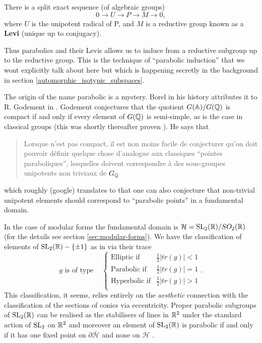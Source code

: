 \begin{Lemma}
    There is a split exact sequence (of algebraic groups)
    \[0 \to U \to P \to M \to 0,\]
    where \(U\) is the unipotent radical of P, and \(M\) is a reductive group known as a \textbf{Levi} (unique up to conjugacy).
\end{Lemma}

Thus parabolics and their Levis allows us to induce from a reductive subgroup up to the reductive group. This is the technique of ``parabolic induction'' \cite[Thm. 10]{bernsteinREPRESENTATIONSPADICGROUPS1992} that we wont explicitly talk about here but which is happening secretly in the background in section \ref{automorphic_isotypic_subspaces}.

\begin{Remark}
    The origin of the name parabolic is a mystery. Borel in his history \cite[VI.\S 2]{EssaysHistoryLie} attributes it to R. Godement in \cite{godementGroupesLineairesAlgebriques}. Godement conjectures that the quotient \(G(\A) / G(\Q)\) is compact if and only if every element of \(G(\Q)\) is semi-simple, as is the case in classical groups (this was shortly thereafter proven \cite{mostowCompactnessArithmeticallyDefined1962}). He says that 
    \begin{quote}
        Lorsque n'est pas compact, il est non moins facile de conjecturer qu’on doit pouvoir définir quelque chose d’analogue aux classiques ``pointes paraboliques'', lesquelles doivent correspondre à des  sous-groupes unipotents non triviaux de \(G_\Q\)
    \end{quote}
    which roughly (google) translates to that one can also conjecture that non-trivial unipotent elements should correspond to ``parabolic points'' in a fundamental domain.

    In the case of modular forms the fundamental domain is \(\mathcal{H} = \SL_2(\R)/SO_2(\R)\) (for the details see section \ref{sec:modular-forms}). We have the classification of elements of  \(\SL_2(\R) -\{\pm 1\}\) as in \cite[3.5]{borelAutomorphicFormsSL21997} via their trace
    \[g\text{ is of type } \;\;\; 
    \begin{cases}
        \text{Elliptic if} & \frac{1}{2}|tr(g)| < 1 \\
        \text{Parabolic if} & \frac{1}{2}|tr(g)| = 1 \\
        \text{Hyperbolic if} & \frac{1}{2}|tr(g)| > 1 \\
    \end{cases}
    .\]
    This classification, it seems, relies entirely on the \textit{aesthetic} connection with the classification of the sections of conics via eccentricity. Proper parabolic subgroups of \(\SL_2(\R)\) can be realised as the stabilisers of lines in \(\R^2\) under the standard action of \(\operatorname{SL}_2\) on \(\R^2\) \cite[2.6]{borelAutomorphicFormsSL21997} and moreover an element of \(\SL_2(\R)\) is parabolic if and only if it has one fixed point on \(\partial\bar{\mathcal{H}}\) and none on \(\mathcal{H}\) \cite[3.5]{borelAutomorphicFormsSL21997}.
    

\end{Remark}

